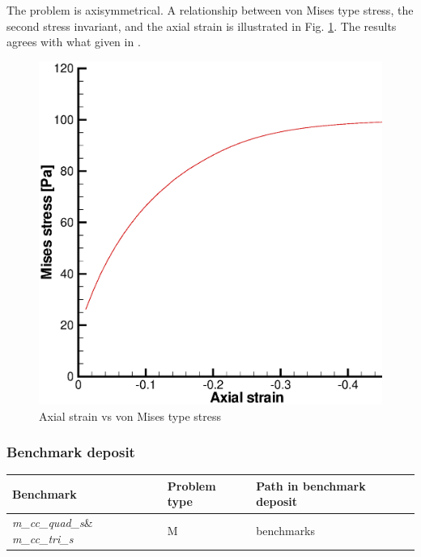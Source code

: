 The problem is axisymmetrical. A relationship between von Mises type stress, the second stress invariant, and the axial strain is illustrated in Fig. \ref{fig:m_cc_s_r}. The results agrees with what given in \cite{SheSloYu00}.

\begin{figure}[H]
  \begin{center}
    \includegraphics[scale=0.3]{M/cc_s_s_e.eps}
  \end{center}
  \caption{Axial strain vs von Mises type stress }
  \label{fig:m_cc_s_r}
\end{figure}

\subsubsection*{Benchmark deposit}

\begin{tabular}{|l|l|l|}
  \hline
  Benchmark & Problem type & Path in benchmark deposit \\
  \hline
 \emph{m\_cc\_quad\_s}\&  \emph{m\_cc\_tri\_s}& M & benchmarks\verb \M\ \\
  \hline
\end{tabular}

